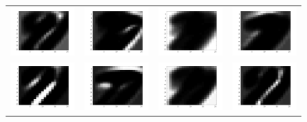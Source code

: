 \documentclass{article} %
\begin{document}
\begin{figure}[H]
\begin{tabular}{cccc}
\\
\includegraphics[width=0.2\linewidth]{images/Fig_act_grey_9.png}
&
\includegraphics[width=0.2\linewidth]{images/Fig_act_grey_10.png}
&
\includegraphics[width=0.2\linewidth]{images/Fig_act_grey_11.png}
&
\includegraphics[width=0.2\linewidth]{images/Fig_act_grey_12.png}
\\
\includegraphics[width=0.2\linewidth]{images/Fig_act_grey_13.png}
&
\includegraphics[width=0.2\linewidth]{images/Fig_act_grey_14.png}
&
\includegraphics[width=0.2\linewidth]{images/Fig_act_grey_15.png}
&
\includegraphics[width=0.2\linewidth]{images/Fig_act_grey_16.png}

\end{tabular}
\end{figure}
\end{document}
